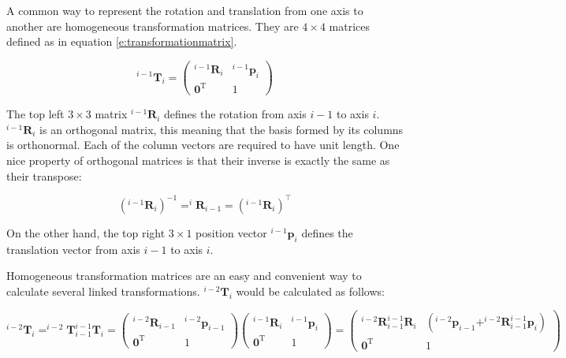 A common way to represent the rotation and translation from one axis to another are homogeneous transformation matrices. They are $4 \times 4$ matrices defined as in equation \ref{e:transformationmatrix}.

\begin{equation}
    \label{e:transformationmatrix}
    ^{i-1}\mathbf{T}_{i} = \left(\begin{array}{cc}
    ^{i-1} \mathbf{R}_{i} & ^{i-1} \boldsymbol{p}_{i} \\
    \mathbf{0}^{\mathrm{T}} & 1
    \end{array}\right)
\end{equation}

The top left $3 \times 3$ matrix $^{i-1} \mathbf{R}_{i}$ defines the rotation from axis $i-1$ to axis $i$. $^{i-1} \mathbf{R}_{i}$ is an orthogonal matrix, this meaning that the basis formed by its columns is orthonormal. Each of the column vectors are required to have unit length. One nice property of orthogonal matrices is that their inverse is exactly the same as their transpose:

$$(^{i-1} \mathbf{R}_{i})^{-1} = ^{i} \mathbf{R}_{i-1} = (^{i-1} \mathbf{R}_{i})^{\intercal}$$

On the other hand, the top right $3 \times 1$ position vector $^{i-1} \boldsymbol{p}_{i}$ defines the translation vector from axis $i-1$ to axis $i$.

Homogeneous transformation matrices are an easy and convenient way to calculate several linked transformations. $^{i-2}\mathbf{T}_{i}$ would be calculated as follows:

$$^{i-2}\mathbf{T}_{i} = ^{i-2}\mathbf{T}_{i-1} ^{i-1}\mathbf{T}_{i} =
    \left(\begin{array}{cc}
    ^{i-2} \mathbf{R}_{i-1} & ^{i-2} \boldsymbol{p}_{i-1} \\
    \mathbf{0}^{\mathrm{T}} & 1
    \end{array}\right)
    \left(\begin{array}{cc}
    ^{i-1} \mathbf{R}_{i} & ^{i-1} \boldsymbol{p}_{i} \\
    \mathbf{0}^{\mathrm{T}} & 1
    \end{array}\right) =
    \left(\begin{array}{cc}
    ^{i-2} \mathbf{R}_{i-1} ^{i-1} \mathbf{R}_{i} & (^{i-2} \boldsymbol{p}_{i-1} +  ^{i-2} \mathbf{R}_{i-1} ^{i-1} \boldsymbol{p}_{i})\\
    \mathbf{0}^{\mathrm{T}} & 1
    \end{array}\right)
$$

